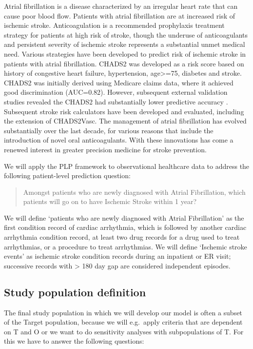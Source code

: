 \documentclass[]{book}
\begin{document}
Atrial fibrillation is a disease characterized by an irregular heart
rate that can cause poor blood flow. Patients with atrial fibrillation
are at increased risk of ischemic stroke. Anticoagulation is a
recommended prophylaxis treatment strategy for patients at high risk of
stroke, though the underuse of anticoagulants and persistent severity of
ischemic stroke represents a substantial unmet medical need. Various
strategies have been developed to predict risk of ischemic stroke in
patients with atrial fibrillation. CHADS2 \citep{gage2001} was developed
as a risk score based on history of congestive heart failure,
hypertension, age\textgreater{}=75, diabetes and stroke. CHADS2 was
initially derived using Medicare claims data, where it achieved good
discrimination (AUC=0.82). However, subsequent external validation
studies revealed the CHADS2 had substantially lower predictive accuracy
\citep{keogh2011}. Subsequent stroke risk calculators have been
developed and evaluated, including the extension of CHADS2Vasc. The
management of atrial fibrillation has evolved substantially over the
last decade, for various reasons that include the introduction of novel
oral anticoagulants. With these innovations has come a renewed interest
in greater precision medicine for stroke prevention.

We will apply the PLP framework to observational healthcare data to
address the following patient-level prediction question:

\begin{quote}
Amongst patients who are newly diagnosed with Atrial Fibrillation, which
patients will go on to have Ischemic Stroke within 1 year?
\end{quote}

We will define `patients who are newly diagnosed with Atrial
Fibrillation' as the first condition record of cardiac arrhythmia, which
is followed by another cardiac arrhythmia condition record, at least two
drug records for a drug used to treat arrhythmias, or a procedure to
treat arrhythmias. We will define `Ischemic stroke events' as ischemic
stroke condition records during an inpatient or ER visit; successive
records with \textgreater{} 180 day gap are considered independent
episodes.

\subsection{Study population
definition}\label{study-population-definition}

The final study population in which we will develop our model is often a
subset of the Target population, because we will e.g.~apply criteria
that are dependent on T and O or we want to do sensitivity analyses with
subpopulations of T. For this we have to answer the following questions:
\end{document}
